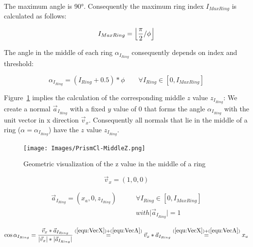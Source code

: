 \documentclass[../ClassicThesis.tex]{subfiles}
\begin{document}
The maximum angle is 90°. Consequently the maximum ring index $I_{MaxRing}$ is calculated as follows:

\begin{equation*}
    I_{MaxRing} = \floor*{
                    \frac{\pi}{2}
                    / \phi
                  }
\end{equation*}



The angle in the middle of each ring ${\alpha}_{I_{Ring}}$ consequently depends on index and threshold:

\begin{equation}
\label{equ:AlphaIRing}
    {\alpha}_{I_{Ring}} = (I_{Ring} + 0.5) * \phi \qquad \forall{ I_{Ring} \in [0, I_{MaxRing}] }
\end{equation}



Figure~\ref{fig:middleZ} implies the calculation of the corresponding middle $z$ value $z_{I_{Ring}}$: We create a normal $\vec{a}_{I_{Ring}}$ with a fixed $y$ value of 0 that forms the angle ${\alpha}_{I_{Ring}}$ with the unit vector in x direction $\vec{v}_{x}$. Consequently all normals that lie in the middle of a ring ($\alpha = {\alpha}_{I_{Ring}}$) have the $z$ value $z_{I_{Ring}}$.

\begin{figure}
    \texttt{[image: Images/PrismCl-MiddleZ.png]}
    \caption{Geometric visualization of the z value in the middle of a ring}
    \label{fig:middleZ}
\end{figure}

\begin{equation}
\label{equ:VecX}
    \vec{v}_{x} = (1, 0, 0)
\end{equation}

\begin{equation}
\begin{split}
    \label{equ:VecA}
    \vec{a}_{I_{Ring}} = (x_{a}, 0, z_{I_{Ring}}) \qquad  & \forall{ I_{Ring} \in [0, I_{MaxRing}] } \\
    & with \vert \vec{a}_{I_{Ring}} \vert = 1
\end{split}
\end{equation}

\begin{equation}
    \label{equ:XA}
    \cos{{\alpha}_{I_{Ring}}} = \frac{ \vec{v}_{x} * \vec{a}_{I_{Ring}} }{ \vert \vec{v}_{x} \vert * \vert \vec{a}_{I_{Ring}} \vert }
    \stackrel{(\ref{equ:VecX}) + (\ref{equ:VecA})}{=} \vec{v}_{x} * \vec{a}_{I_{Ring}}
    \stackrel{(\ref{equ:VecX}) + (\ref{equ:VecA})}{=} x_{a}
\end{equation}
\end{document}
